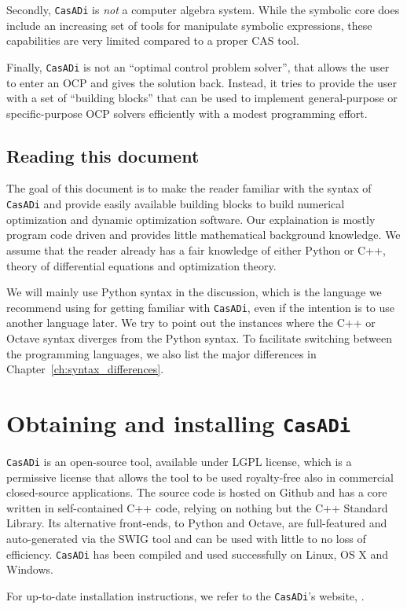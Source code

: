 \documentclass[a4paper,12pt]{book}
\newcommand{\CasADi}{\texttt{CasADi}\xspace}
\begin{document}
Secondly, \CasADi is \emph{not} a computer algebra system. While the symbolic core does include an increasing set of tools for manipulate symbolic expressions, these capabilities are very limited compared to a proper CAS tool.

Finally, \CasADi is not an ``optimal control problem solver'', that allows the user to enter an OCP and gives the solution back. Instead, it tries to provide the user with a set of ``building blocks'' that can be used to implement general-purpose or specific-purpose OCP solvers efficiently with a modest programming effort.

\section{Reading this document}
The goal of this document is to make the reader familiar with the syntax of \CasADi and provide easily available building blocks to build numerical optimization and dynamic optimization software. Our explaination is mostly program code driven and provides little mathematical background knowledge. We assume that the reader already has a fair knowledge of either Python or C++, theory of differential equations and optimization theory. 

We will mainly use Python syntax in the discussion, which is the language we recommend using for getting familiar with \CasADi, even if the intention is to use another language later. We try to point out the instances where the C++ or Octave syntax diverges from the Python syntax. To facilitate switching between the programming languages, we also list the major differences in Chapter~\ref{ch:syntax_differences}.

\chapter{Obtaining and installing \CasADi}
\CasADi is an open-source tool, available under LGPL license, which is a permissive license that allows the tool to be used royalty-free also in commercial closed-source applications. The source code is hosted on Github and has a core written in self-contained C++ code, relying on nothing but the C++ Standard Library. Its alternative front-ends, to Python and Octave, are full-featured and auto-generated via the SWIG tool and can be used with little to no loss of efficiency. \CasADi has been compiled and used successfully on Linux, OS X and Windows.

For up-to-date installation instructions, we refer to the \CasADi's website, .
\end{document}
